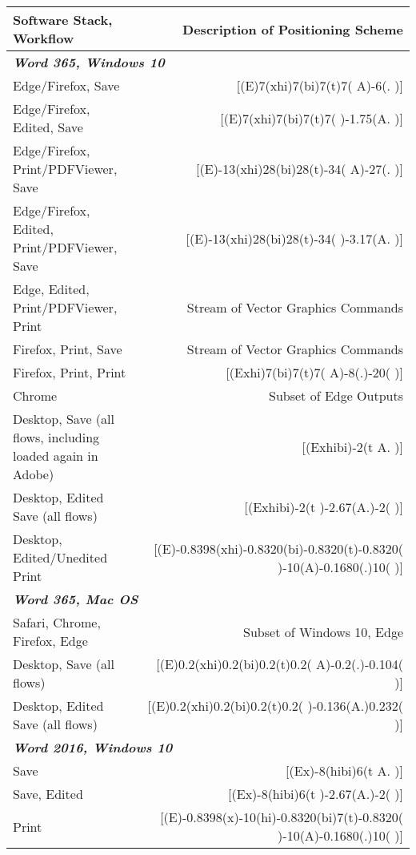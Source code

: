 \begin{tabular}{l@{\hskip -6cm}r}
  \toprule
  Software Stack, Workflow & Description of Positioning Scheme \\
  \midrule \multicolumn{2}{l}{\emph{\textbf{Word 365, Windows 10}}} \\
      {Edge/Firefox, Save} &
      [(E)7(xhi)7(bi)7(t)7( A)-6(. )] \\
      {Edge/Firefox, Edited, Save} &
      [(E)7(xhi)7(bi)7(t)7( )-1.75(A. )] \\
      {Edge/Firefox, Print/PDFViewer, Save} &
      [(E)-13(xhi)28(bi)28(t)-34( A)-27(. )] \\
      {Edge/Firefox, Edited, Print/PDFViewer, Save} &
      [(E)-13(xhi)28(bi)28(t)-34( )-3.17(A. )] \\
      {Edge, Edited, Print/PDFViewer, Print} &
      Stream of Vector Graphics Commands \\
      {Firefox, Print, Save} &
      Stream of Vector Graphics Commands \\
      {Firefox, Print, Print} &
      [(Exhi)7(bi)7(t)7( A)-8(.)-20( )] \\
      {Chrome} &
      Subset of Edge Outputs \\
      {Desktop, Save (all flows, including loaded again in Adobe)} &
      [(Exhibi)-2(t A. )] \\
      {Desktop, Edited Save (all flows)} &
      [(Exhibi)-2(t )-2.67(A.)-2( )] \\
      {Desktop, Edited/Unedited Print} &
      [(E)-0.8398(xhi)-0.8320(bi)-0.8320(t)-0.8320( )-10(A)-0.1680(.)10( )] \\
  \midrule \multicolumn{2}{l}{\emph{\textbf{Word 365, Mac OS}}} \\
      {Safari, Chrome, Firefox, Edge} &
      Subset of Windows 10, Edge \\
      {Desktop, Save (all flows)} &
      [(E)0.2(xhi)0.2(bi)0.2(t)0.2( A)-0.2(.)-0.104( )] \\
      {Desktop, Edited Save (all flows)} &
      [(E)0.2(xhi)0.2(bi)0.2(t)0.2( )-0.136(A.)0.232( )] \\
  \midrule \multicolumn{2}{l}{\emph{\textbf{Word 2016, Windows 10}}} \\
      {Save} &
      [(Ex)-8(hibi)6(t A. )] \\
      {Save, Edited} &
      [(Ex)-8(hibi)6(t )-2.67(A.)-2( )] \\
      {Print} &
      [(E)-0.8398(x)-10(hi)-0.8320(bi)7(t)-0.8320( )-10(A)-0.1680(.)10( )] \\

\end{tabular}
